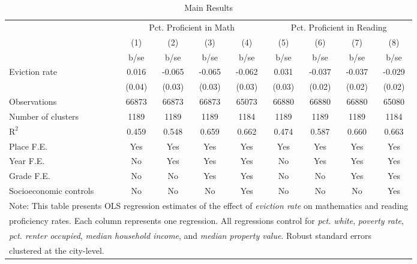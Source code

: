 \begin{table}[htbp]\centering
\def\sym#1{\ifmmode^{#1}\else\(^{#1}\)\fi}
\caption{Main Results}
\begin{tabular}{l*{8}{c}}
\toprule
                    &\multicolumn{4}{c}{Pct. Proficient in Math}        &\multicolumn{4}{c}{Pct. Proficient in Reading}     \\\cmidrule(lr){2-5}\cmidrule(lr){6-9}
                    &\multicolumn{1}{c}{(1)}&\multicolumn{1}{c}{(2)}&\multicolumn{1}{c}{(3)}&\multicolumn{1}{c}{(4)}&\multicolumn{1}{c}{(5)}&\multicolumn{1}{c}{(6)}&\multicolumn{1}{c}{(7)}&\multicolumn{1}{c}{(8)}\\
                    &        b/se&        b/se&        b/se&        b/se&        b/se&        b/se&        b/se&        b/se\\
\midrule
Eviction rate       &       0.016&      -0.065&      -0.065&      -0.062&       0.031&      -0.037&      -0.037&      -0.029\\
                    &      (0.04)&      (0.03)&      (0.03)&      (0.03)&      (0.03)&      (0.02)&      (0.02)&      (0.02)\\
\midrule
Observations        &       66873&       66873&       66873&       65073&       66880&       66880&       66880&       65080\\
Number of clusters  &        1189&        1189&        1189&        1184&        1189&        1189&        1189&        1184\\
$\text{R}^2$        &       0.459&       0.548&       0.659&       0.662&       0.474&       0.587&       0.660&       0.663\\
Place F.E.          &         Yes&         Yes&         Yes&         Yes&         Yes&         Yes&         Yes&         Yes\\
Year F.E.           &          No&         Yes&         Yes&         Yes&          No&         Yes&         Yes&         Yes\\
Grade F.E.          &          No&          No&         Yes&         Yes&          No&          No&         Yes&         Yes\\
Socioeconomic controls&          No&          No&          No&         Yes&          No&          No&          No&         Yes\\
\bottomrule
\multicolumn{9}{l}{\footnotesize Note: This table presents OLS regression estimates of the effect of \emph{eviction rate} on mathematics and reading}\\
\multicolumn{9}{l}{\footnotesize proficiency rates. Each column represents one regression. All regressions control for \emph{pct. white}, \emph{poverty rate},}\\
\multicolumn{9}{l}{\footnotesize \emph{pct. renter occupied}, \emph{median household income}, and \emph{median property value}. Robust standard errors}\\
\multicolumn{9}{l}{\footnotesize clustered at the city-level.}\\
\end{tabular}
\end{table}
